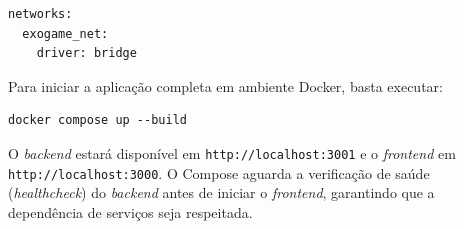 \documentclass[
	12pt,
	openany,
	oneside,
	a4paper,
	english,
	brazil
]{abntex2}
\begin{document}
\begin{apendicesenv}
\begin{lstlisting}[caption={docker-compose.yml -- orquestração dos serviços ExoGame (backend Phoenix/Elixir)},
                   label={lst:docker_compose}]
networks:
  exogame_net:
    driver: bridge
\end{lstlisting}

Para iniciar a aplicação completa em ambiente Docker, basta executar:

\begin{lstlisting}[language={}]
docker compose up --build
\end{lstlisting}

O \textit{backend} estará disponível em \texttt{http://localhost:3001} e o \textit{frontend} em \texttt{http://localhost:3000}. O Compose aguarda a verificação de saúde (\textit{healthcheck}) do \textit{backend} antes de iniciar o \textit{frontend}, garantindo que a dependência de serviços seja respeitada.

\end{apendicesenv}

\printindex
\end{document}
